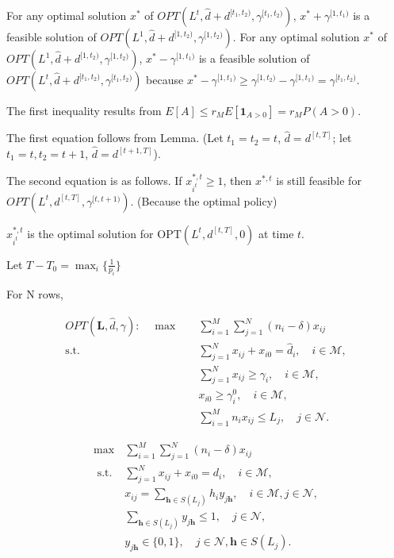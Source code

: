 For any optimal solution $x^{*}$ of $OPT(L^{t}, \hat{d}+d^{[t_1, t_2)}, \gamma^{[t_1, t_2)})$, $x^{*} + \gamma^{[1, t_1)}$ is a feasible solution of $OPT(L^{1}, \hat{d}+d^{[1, t_2)}, \gamma^{[1, t_2)})$. For any optimal solution $x^{*}$ of $OPT(L^{1}, \hat{d}+d^{[1, t_2)}, \gamma^{[1, t_2)})$, $x^{*}- \gamma^{[1, t_1)}$ is a feasible solution of $OPT(L^{t}, \hat{d}+d^{[t_1, t_2)}, \gamma^{[t_1, t_2)})$ because $x^{*}- \gamma^{[1, t_1)} \geq \gamma^{[1, t_{2})}- \gamma^{[1, t_1)} = \gamma^{[t_1, t_2)}$.


The first inequality results from $E[A] \leq r_{M} E[\bm{1}_{A>0}] = r_{M} P(A>0)$.

The first equation follows from Lemma. (Let $t_1 = t_2 = t$, $\hat{d} = d^{[t, T]}$; let $t_1 = t, t_2 = t+1$, $\hat{d} = d^{[t+1, T]}$).

The second equation is as follows. If $x_{i^{t}}^{*,t} \geq 1$, then $x^{*,t}$ is still feasible for $OPT(L^{t}, d^{[t, T]}, \gamma^{[t,t+1)})$. (Because the optimal policy)

$x_{i^{t}}^{*,t}$ is the optimal solution for $\text{OPT}(L^{t}, d^{[t, T]}, 0)$ at time $t$.

Let $T- T_{0} = \max_{i}\{\frac{1}{p_{i}}\}$


For N rows,

\begin{align*}
    OPT(\bm{L}, \hat{d}, \gamma): \quad \max \quad & \sum_{i = 1}^{M} \sum_{j = 1}^{N} (n_i - \delta) x_{ij} \\
    \text {s.t.} \quad & \sum_{j=1}^{N} x_{ij} + x_{i0} = \hat{d}_{i}, \quad i \in \mathcal{M},  \\ 
    & \sum_{j=1}^{N} x_{ij} \geq \gamma_{i}, \quad i \in \mathcal{M}, \\
    & x_{i0} \geq \gamma_{i}^{0}, \quad i \in \mathcal{M}, \\
    & \sum_{i=1}^{M} n_{i} x_{ij} \leq L_{j}, \quad j \in \mathcal{N}.
\end{align*}


\begin{equation}
    \begin{array}{ll}
    \max & \sum_{i=1}^M \sum_{j=1}^N\left(n_i-\delta\right) x_{i j} \\
    \text { s.t. } & \sum_{j=1}^N x_{i j} + x_{i0} = d_i, \quad i \in \mathcal{M}, \\
    & x_{i j}=\sum_{\bm{h} \in S(L_{j})} h_i y_{j \bm{h}}, \quad i \in \mathcal{M}, j \in \mathcal{N}, \\
    & \sum_{\bm{h} \in S(L_{j})} y_{j \bm{h}} \leq 1, \quad j \in \mathcal{N}, \\
    & y_{j \bm{h}} \in\{0,1\}, \quad j \in \mathcal{N}, \bm{h} \in S(L_{j}).
    \end{array}
\end{equation}

